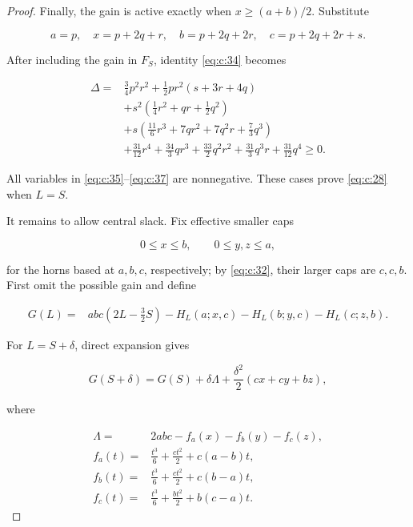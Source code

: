 \begin{proof}
Finally, the gain is active exactly when \(x\ge(a+b)/2\). Substitute

\[
a=p,\quad x=p+2q+r,\quad b=p+2q+2r,
\quad c=p+2q+2r+s.
\]

After including the gain in \(F_S\), identity \eqref{eq:c:34} becomes

\begin{equation}
\begin{aligned}
\Delta={}&\frac34p^2r^2+\frac12pr^2(s+3r+4q)\\
&+s^2\left(\frac14r^2+qr+\frac12q^2\right)\\
&+s\left(\frac{11}{6}r^3+7qr^2+7q^2r+\frac73q^3\right)\\
&+\frac{31}{12}r^4+\frac{34}{3}qr^3
 +\frac{33}{2}q^2r^2+\frac{31}{3}q^3r
 +\frac{31}{12}q^4\ge0.
\end{aligned}
\label{eq:c:37}
\end{equation}

All variables in \eqref{eq:c:35}--\eqref{eq:c:37} are nonnegative. These cases prove \eqref{eq:c:28} when
\(L=S\).

It remains to allow central slack. Fix effective smaller caps

\[
0\le x\le b,\qquad0\le y,z\le a,
\]

for the horns based at \(a,b,c\), respectively; by \eqref{eq:c:32}, their larger caps
are \(c,c,b\). First omit the possible gain and define

\begin{equation}
\begin{aligned}
G(L)={}&abc\left(2L-\frac32S\right)
 -H_L(a;x,c)-H_L(b;y,c)-H_L(c;z,b).
\end{aligned}
\label{eq:c:38}
\end{equation}

For \(L=S+\delta\), direct expansion gives

\begin{equation}
G(S+\delta)=G(S)+\delta\Lambda
 +\frac{\delta^2}{2}(cx+cy+bz),
\label{eq:c:39}
\end{equation}

where

\begin{equation}
\begin{aligned}
\Lambda={}&2abc-f_a(x)-f_b(y)-f_c(z),\\
f_a(t)={}&\frac{t^3}{6}+\frac{ct^2}{2}+c(a-b)t,\\
f_b(t)={}&\frac{t^3}{6}+\frac{ct^2}{2}+c(b-a)t,\\
f_c(t)={}&\frac{t^3}{6}+\frac{bt^2}{2}+b(c-a)t.
\end{aligned}
\label{eq:c:40}
\end{equation}


\end{proof}
